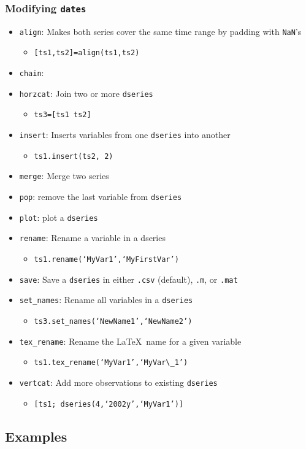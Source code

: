 \documentclass[10pt]{beamer}
\newcommand{\myitem}{\item[$\bullet$]}
\begin{document}
\begin{frame}[fragile,t]
  \frametitle{Modifying \texttt{dates}}
  \begin{itemize}
  \myitem \texttt{align}: Makes both series cover the same time range by padding with \texttt{NaN}'s
    \begin{itemize}
    \myitem \texttt{[ts1,ts2]=align(ts1,ts2)}
    \end{itemize}
  \myitem \texttt{chain}:
  \myitem \texttt{horzcat}: Join two or more \texttt{dseries}
    \begin{itemize}
    \myitem \texttt{ts3=[ts1 ts2]}
    \end{itemize}
  \myitem \texttt{insert}: Inserts variables from one \texttt{dseries} into another
    \begin{itemize}
    \myitem \texttt{ts1.insert(ts2, 2)}
    \end{itemize}
  \myitem \texttt{merge}: Merge two series
  \myitem \texttt{pop}: remove the last variable from \texttt{dseries}
  \myitem \texttt{plot}: plot a \texttt{dseries}
  \myitem \texttt{rename}: Rename a variable in a dseries
    \begin{itemize}
    \myitem \texttt{ts1.rename(`MyVar1',`MyFirstVar')}
    \end{itemize}
  \myitem \texttt{save}: Save a \texttt{dseries} in either \texttt{.csv} (default), \texttt{.m}, or \texttt{.mat}
  \myitem \texttt{set\_names}: Rename all variables in a \texttt{dseries}
    \begin{itemize}
    \myitem \texttt{ts3.set\_names(`NewName1',`NewName2')}
    \end{itemize}
  \myitem \texttt{tex\_rename}: Rename the \LaTeX\ name for a given variable
    \begin{itemize}
    \myitem \texttt{ts1.tex\_rename(`MyVar1',`MyVar\textbackslash\_1')}
    \end{itemize}
  \myitem \texttt{vertcat}: Add more observations to existing \texttt{dseries}
    \begin{itemize}
    \myitem \texttt{[ts1; dseries(4,`2002y',`MyVar1')]}
    \end{itemize}
  \end{itemize}
\end{frame}



\subsection{Examples}
\end{document}
